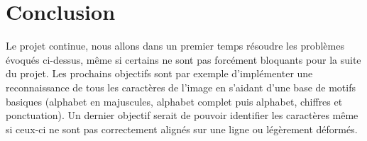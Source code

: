 \documentclass[a4paper,12pt,titlepage]{report}
\begin{document}
	\section{Conclusion}
	Le projet continue, nous allons dans un premier temps résoudre les problèmes évoqués ci-dessus, même si certains ne sont pas forcément bloquants pour la suite du projet.
	Les prochains objectifs sont par exemple d'implémenter une reconnaissance de tous les caractères de l'image en s'aidant d'une base de motifs basiques (alphabet en majuscules, alphabet complet puis alphabet, chiffres et ponctuation).
	Un dernier objectif serait de pouvoir identifier les caractères même si ceux-ci ne sont pas correctement alignés sur une ligne ou légèrement déformés.
\end{document}

